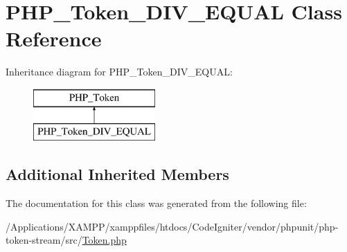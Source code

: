 \hypertarget{class_p_h_p___token___d_i_v___e_q_u_a_l}{}\section{P\+H\+P\+\_\+\+Token\+\_\+\+D\+I\+V\+\_\+\+E\+Q\+U\+AL Class Reference}
\label{class_p_h_p___token___d_i_v___e_q_u_a_l}
Inheritance diagram for P\+H\+P\+\_\+\+Token\+\_\+\+D\+I\+V\+\_\+\+E\+Q\+U\+AL\+:\begin{figure}[H]
\begin{center}
\leavevmode
\includegraphics[height=2.000000cm]{class_p_h_p___token___d_i_v___e_q_u_a_l}
\end{center}
\end{figure}
\subsection*{Additional Inherited Members}


The documentation for this class was generated from the following file\+:\begin{DoxyCompactItemize}
\item 
/\+Applications/\+X\+A\+M\+P\+P/xamppfiles/htdocs/\+Code\+Igniter/vendor/phpunit/php-\/token-\/stream/src/\mbox{\hyperlink{_token_8php}{Token.\+php}}\end{DoxyCompactItemize}
